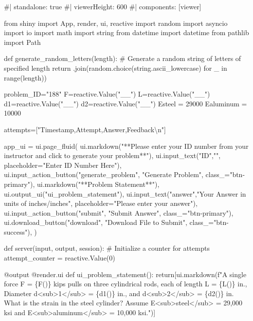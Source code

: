\documentclass[
  letterpaper,
  DIV=11,
  numbers=noendperiod]{scrreprt}
\newenvironment{Shaded}{\begin{snugshade}}{\end{snugshade}}
\newcommand{\NormalTok}[1]{\textcolor[rgb]{0.00,0.23,0.31}{#1}}
\begin{document}
\begin{Shaded}
\begin{Highlighting}[]
\NormalTok{\#| standalone: true}
\NormalTok{\#| viewerHeight: 600}
\NormalTok{\#| components: [viewer]}

\NormalTok{from shiny import App, render, ui, reactive}
\NormalTok{import random}
\NormalTok{import asyncio}
\NormalTok{import io}
\NormalTok{import math}
\NormalTok{import string}
\NormalTok{from datetime import datetime}
\NormalTok{from pathlib import Path}

\NormalTok{def generate\_random\_letters(length):}
\NormalTok{    \# Generate a random string of letters of specified length}
\NormalTok{    return \textquotesingle{}\textquotesingle{}.join(random.choice(string.ascii\_lowercase) for \_ in range(length))}

\NormalTok{problem\_ID="188"}
\NormalTok{F=reactive.Value("\_\_")}
\NormalTok{L=reactive.Value("\_\_")}
\NormalTok{d1=reactive.Value("\_\_")}
\NormalTok{d2=reactive.Value("\_\_")}
\NormalTok{Esteel = 29000}
\NormalTok{Ealuminum = 10000}


\NormalTok{attempts=["Timestamp,Attempt,Answer,Feedback\textbackslash{}n"]}

\NormalTok{app\_ui = ui.page\_fluid(}
\NormalTok{    ui.markdown("**Please enter your ID number from your instructor and click to generate your problem**"),}
\NormalTok{    ui.input\_text("ID","", placeholder="Enter ID Number Here"),}
\NormalTok{    ui.input\_action\_button("generate\_problem", "Generate Problem", class\_="btn{-}primary"),}
\NormalTok{    ui.markdown("**Problem Statement**"),}
\NormalTok{    ui.output\_ui("ui\_problem\_statement"),}
\NormalTok{    ui.input\_text("answer","Your Answer in units of inches/inches", placeholder="Please enter your answer"),}
\NormalTok{    ui.input\_action\_button("submit", "Submit Answer", class\_="btn{-}primary"),}
\NormalTok{    ui.download\_button("download", "Download File to Submit", class\_="btn{-}success"),}
\NormalTok{)}


\NormalTok{def server(input, output, session):}
\NormalTok{    \# Initialize a counter for attempts}
\NormalTok{    attempt\_counter = reactive.Value(0)}

\NormalTok{    @output}
\NormalTok{    @render.ui}
\NormalTok{    def ui\_problem\_statement():}
\NormalTok{        return[ui.markdown(f"A single force F = \{F()\} kips pulls on three cylindrical rods, each of length L = \{L()\} in., Diameter d\textless{}sub\textgreater{}1\textless{}/sub\textgreater{} = \{d1()\} in., and d\textless{}sub\textgreater{}2\textless{}/sub\textgreater{} = \{d2()\} in. What is the strain in the steel cylinder? Assume E\textless{}sub\textgreater{}steel\textless{}/sub\textgreater{} = 29,000 ksi and E\textless{}sub\textgreater{}aluminum\textless{}/sub\textgreater{} = 10,000 ksi.")]}
    

\end{Highlighting}
\end{Shaded}
\end{document}
